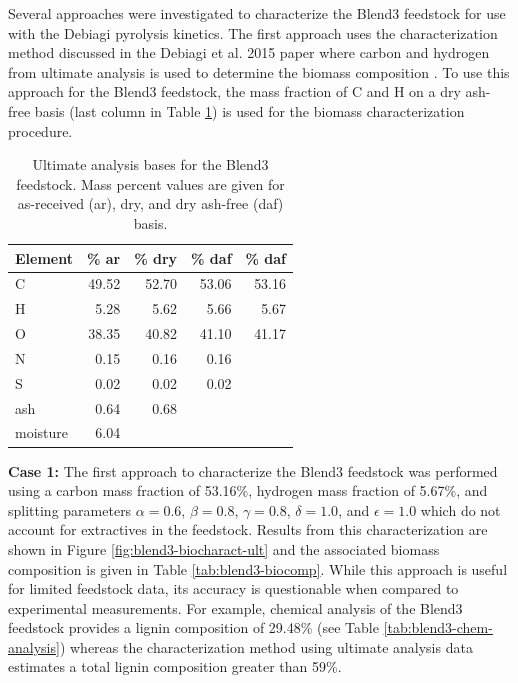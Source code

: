 Several approaches were investigated to characterize the Blend3 feedstock for use with the Debiagi pyrolysis kinetics. The first approach uses the characterization method discussed in the Debiagi et al. 2015 paper where carbon and hydrogen from ultimate analysis is used to determine the biomass composition \cite{Debiagi-2015}. To use this approach for the Blend3 feedstock, the mass fraction of C and H on a dry ash-free basis (last column in Table \ref{tab:blend3-ult-bases}) is used for the biomass characterization procedure.

\begin{table}[H]
    \centering
    \caption{Ultimate analysis bases for the Blend3 feedstock. Mass percent values are given for as-received (ar), dry, and dry ash-free (daf) basis.}
    \label{tab:blend3-ult-bases}
    \begin{tabular}{lrrrr}
        \toprule
        Element & \% ar & \% dry & \% daf & \% daf \\
        \midrule
        C        & 49.52 & 52.70 & 53.06 & 53.16 \\
        H        & 5.28  & 5.62  & 5.66  & 5.67  \\
        O        & 38.35 & 40.82 & 41.10 & 41.17 \\
        N        & 0.15  & 0.16  & 0.16  &       \\
        S        & 0.02  & 0.02  & 0.02  &       \\
        ash      & 0.64  & 0.68  &       &       \\
        moisture & 6.04  &       &       &       \\
        \bottomrule
    \end{tabular}
\end{table}

\textbf{Case 1:} The first approach to characterize the Blend3 feedstock was performed using a carbon mass fraction of 53.16\%, hydrogen mass fraction of 5.67\%, and splitting parameters $\alpha = 0.6$, $\beta = 0.8$, $\gamma = 0.8$, $\delta = 1.0$, and $\epsilon = 1.0$ which do not account for extractives in the feedstock. Results from this characterization are shown in Figure \ref{fig:blend3-biocharact-ult} and the associated biomass composition is given in Table \ref{tab:blend3-biocomp}. While this approach is useful for limited feedstock data, its accuracy is questionable when compared to experimental measurements. For example, chemical analysis of the Blend3 feedstock provides a lignin composition of 29.48\% (see Table \ref{tab:blend3-chem-analysis}) whereas the characterization method using ultimate analysis data estimates a total lignin composition greater than 59\%.

